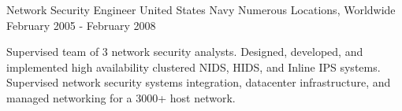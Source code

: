 \begin{cventries}
  \cventry
    {Network Security Engineer} %
    {United States Navy} %
    {Numerous Locations, Worldwide} %
    {February 2005 - February 2008} %
    {
      \begin{cvitems} %
        \item {Supervised team of 3 network security analysts. Designed, developed, and implemented high
        availability clustered NIDS, HIDS, and Inline IPS systems. Supervised network security systems
        integration, datacenter infrastructure, and managed networking for a 3000+ host network.}
      \end{cvitems}
    }    
\end{cventries}

